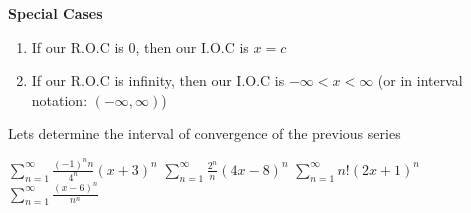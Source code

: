 \documentclass[addpoints]{exam}
\begin{document}
\begin{tcolorbox}[title= INTERVAL OF CONVERGENCE,colframe=black,sharp corners,colback=white,colbacktitle=white,coltitle=black]
    \large \textbf{Special Cases} \normalsize \\
    \begin{enumerate}
        \item If our R.O.C is 0, then our I.O.C is $x=c$
        \item If our R.O.C is infinity, then our I.O.C is $-\infty < x < \infty$ (or in interval notation: \(\left(-\infty, \infty\right)\))
    \end{enumerate}
\end{tcolorbox}
Lets determine the interval of convergence of the previous series
\begin{questions}
    \question \(\displaystyle
    \sum\limits_{n = 1}^\infty  {\frac{{{{\left( { - 1} \right)}^n}n}}{{{4^n}}}{{\left( {x + 3} \right)}^n}}
    \)
    \question \(\displaystyle
   \sum\limits_{n = 1}^\infty  {\frac{{{2^n}}}{n}{{\left( {4x - 8} \right)}^n}} 
    \)
    \question \(\displaystyle
   \sum\limits_{n = 1}^\infty n\textbf{!}\left(2x+1\right)^{n}
    \)
    \question \(\displaystyle
   \sum\limits_{n = 1}^\infty  {\frac{{{{\left( {x - 6} \right)}^n}}}{{{n^n}}}}
    \)
\end{questions}

\newpage
\end{document}
